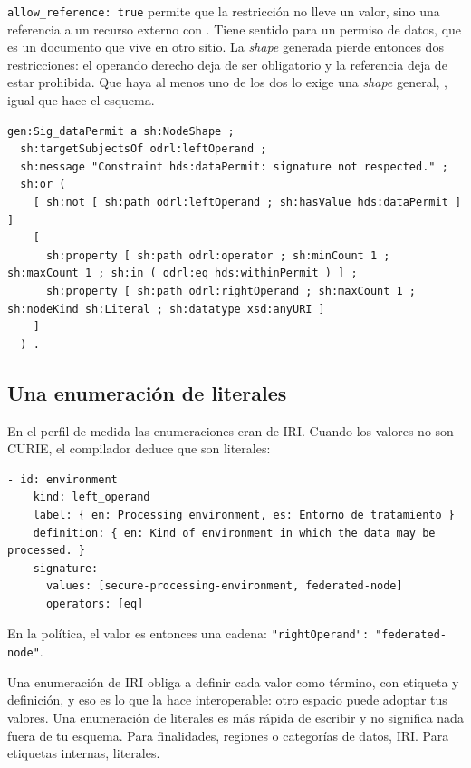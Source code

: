 \texttt{allow\_reference: true} permite que la restricción no lleve un valor, sino una referencia a un recurso
externo con . Tiene sentido para un permiso de datos, que es un documento que vive en
otro sitio. La \emph{shape} generada pierde entonces dos restricciones: el operando derecho deja de ser
obligatorio y la referencia deja de estar prohibida. Que haya al menos uno de los dos lo exige una
\emph{shape} general, , igual que hace el esquema.

\begin{lstlisting}[style=ttl]
gen:Sig_dataPermit a sh:NodeShape ;
  sh:targetSubjectsOf odrl:leftOperand ;
  sh:message "Constraint hds:dataPermit: signature not respected." ;
  sh:or (
    [ sh:not [ sh:path odrl:leftOperand ; sh:hasValue hds:dataPermit ] ]
    [
      sh:property [ sh:path odrl:operator ; sh:minCount 1 ; sh:maxCount 1 ; sh:in ( odrl:eq hds:withinPermit ) ] ;
      sh:property [ sh:path odrl:rightOperand ; sh:maxCount 1 ; sh:nodeKind sh:Literal ; sh:datatype xsd:anyURI ]
    ]
  ) .
\end{lstlisting}

\subsection{Una enumeración de literales}

En el perfil de medida las enumeraciones eran de IRI. Cuando los valores no son CURIE, el compilador deduce que
son literales:

\begin{lstlisting}[style=yaml]
  - id: environment
    kind: left_operand
    label: { en: Processing environment, es: Entorno de tratamiento }
    definition: { en: Kind of environment in which the data may be processed. }
    signature:
      values: [secure-processing-environment, federated-node]
      operators: [eq]
\end{lstlisting}

En la política, el valor es entonces una cadena: \texttt{"rightOperand": "federated-node"}.

\begin{notaPractica}
Una enumeración de IRI obliga a definir cada valor como término, con etiqueta y definición, y eso es lo que la
hace interoperable: otro espacio puede adoptar tus valores. Una enumeración de literales es más rápida de
escribir y no significa nada fuera de tu esquema. Para finalidades, regiones o categorías de datos, IRI. Para
etiquetas internas, literales.
\end{notaPractica}

